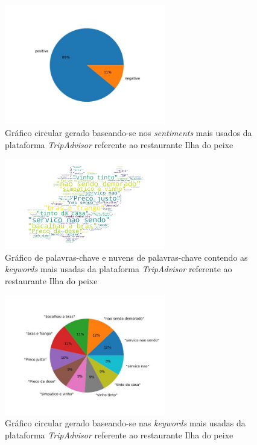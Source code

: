 \begin{figure}[!htb]
\centering
\includegraphics[width=7cm]{figuras/TripAdvisor/Restaurants/restaurant21_sentiments.jpeg}
\caption{Gráfico circular gerado baseando-se nos \textit{sentiments} mais usados da plataforma \textit{TripAdvisor} referente ao restaurante Ilha do peixe}
\label{fig:exemplofig}
\end{figure}

\begin{figure}[!htb]
\centering
\includegraphics[width=7cm]{figuras/TripAdvisor/Restaurants/restaurant21_keywordcloud.jpeg}
\caption{Gráfico de palavras-chave e nuvens de palavras-chave contendo as \textit{keywords} mais usadas da plataforma \textit{TripAdvisor} referente ao restaurante Ilha do peixe}
\label{fig:exemplofig}
\end{figure}

\begin{figure}[!htb]
\centering
\includegraphics[width=7cm]{figuras/TripAdvisor/Restaurants/restaurant21_keywords.jpeg}
\caption{Gráfico circular gerado baseando-se nas \textit{keywords} mais usadas da plataforma \textit{TripAdvisor} referente ao restaurante Ilha do peixe}
\label{fig:exemplofig}
\end{figure}

